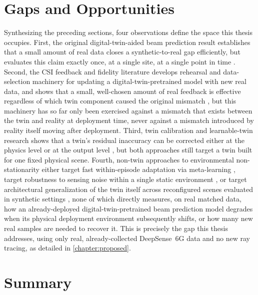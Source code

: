 \documentclass{iutbscthesis}
\begin{document}
\section{Gaps and Opportunities}

Synthesizing the preceding sections, four observations define the space this thesis occupies. First, the original digital-twin-aided beam prediction result establishes that a small amount of real data closes a synthetic-to-real gap efficiently, but evaluates this claim exactly once, at a single site, at a single point in time \cite{jiang2023digitaltwinbeam}. Second, the CSI feedback and fidelity literature develops rehearsal and data-selection machinery for updating a digital-twin-pretrained model with new real data, and shows that a small, well-chosen amount of real feedback is effective regardless of which twin component caused the original mismatch \cite{jiang2024digitaltwincsi, luo2025fidelity}, but this machinery has so far only been exercised against a mismatch that exists between the twin and reality at deployment time, never against a mismatch introduced by reality itself moving after deployment. Third, twin calibration and learnable-twin research shows that a twin's residual inaccuracy can be corrected either at the physics level or at the output level \cite{luo2026calibration, jiang2025learnable}, but both approaches still target a twin built for one fixed physical scene. Fourth, non-twin approaches to environmental non-stationarity either target fast within-episode adaptation via meta-learning \cite{cao2025memristor}, target robustness to sensing noise within a single static environment \cite{khan2025dtxai}, or target architectural generalization of the twin itself across reconfigured scenes evaluated in synthetic settings \cite{zhang2026radtwin}, none of which directly measures, on real matched data, how an already-deployed digital-twin-pretrained beam prediction model degrades when its physical deployment environment subsequently shifts, or how many new real samples are needed to recover it. This is precisely the gap this thesis addresses, using only real, already-collected DeepSense~6G data and no new ray tracing, as detailed in \autoref{chapter:proposed}.

\section{Summary}
\end{document}
